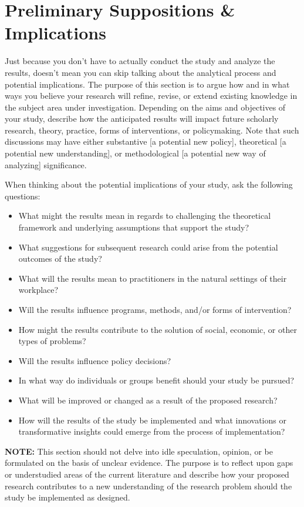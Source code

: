 \documentclass[10pt,twocolumn,letterpaper]{article}
\begin{document}
\section{Preliminary Suppositions \& Implications}
Just because you don't have to actually conduct the study and analyze the results, doesn't mean you can skip talking about the analytical process and potential implications. The purpose of this section is to argue how and in what ways you believe your research will refine, revise, or extend existing knowledge in the subject area under investigation. Depending on the aims and objectives of your study, describe how the anticipated results will impact future scholarly research, theory, practice, forms of interventions, or policymaking. Note that such discussions may have either substantive [a potential new policy], theoretical [a potential new understanding], or methodological [a potential new way of analyzing] significance.

When thinking about the potential implications of your study, ask the following questions:
\begin{itemize}
    \item What might the results mean in regards to challenging the theoretical framework and underlying assumptions that support the study?
    \item What suggestions for subsequent research could arise from the potential outcomes of the study?
    \item What will the results mean to practitioners in the natural settings of their workplace?
    \item Will the results influence programs, methods, and/or forms of intervention?
    \item How might the results contribute to the solution of social, economic, or other types of problems?
    \item Will the results influence policy decisions?
    \item In what way do individuals or groups benefit should your study be pursued?
    \item What will be improved or changed as a result of the proposed research?
    \item How will the results of the study be implemented and what innovations or transformative insights could emerge from the process of implementation?
\end{itemize}

\textbf{NOTE:} This section should not delve into idle speculation, opinion, or be formulated on the basis of unclear evidence. The purpose is to reflect upon gaps or understudied areas of the current literature and describe how your proposed research contributes to a new understanding of the research problem should the study be implemented as designed.
\end{document}
